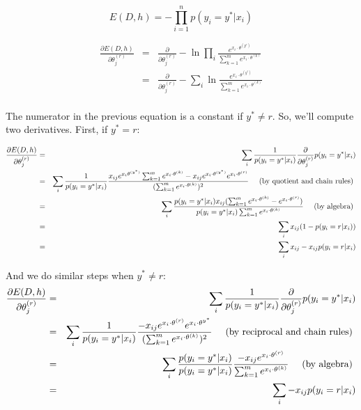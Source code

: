 \documentclass{article}
\begin{document}
$$
E(D, h) = - \prod_{i=1}^{n}p(y_i=y^*|x_i)
$$

\begin{eqnarray*}
\frac{\partial E(D,h)}{\partial \theta_j^{(r)}} & = & \frac{\partial}{\partial \theta_j^{(r)}}- \ln \prod_i \frac{e^{x_i \cdot \theta^{(y^*)}}}{\sum_{k=1}^m e^{x_i \cdot \theta^{(k)}}}\\
& = & \frac{\partial}{\partial \theta_j^{(r)}}- \sum_i \ln \frac{e^{x_i \cdot \theta^{(y^*)}}}{\sum_{k=1}^m e^{x_i \cdot \theta^{(k)}}}\\
\end{eqnarray*}

The numerator in the previous equation is a constant if $y^* \ne r$. So, we'll
compute two derivatives. First, if $y^* = r$:

\begin{eqnarray*}
\frac{\partial E(D,h)}{\partial \theta_j^{(r)}} & = & \sum_i \frac{1}{p(y_i=y^*|x_i)} \frac{\partial}{\partial \theta_j^{(r)}} p(y_i=y^*|x_i)\\
& = & \sum_i \frac{1}{p(y_i=y^*|x_i)} \frac{x_{ij} e^{x_i \theta^{(y^*)}}\sum_{k=1}^m e^{x_i \cdot \theta^{(k)}} - x_{ij}e^{x_i \cdot \theta^{(y^*)}} e^{x_i \cdot \theta^{(r)}}}{(\sum_{k=1}^m e^{x_i \cdot \theta^{(k)}})^2}  \hbox{ \hspace{.1in} (by quotient and chain rules) }\\
& = & \sum_i  \frac{p(y_i=y^*|x_i)x_{ij} (\sum_{k=1}^m  e^{x_i \cdot \theta^{(k)}} -  e^{x_i \cdot \theta^{(r)}})}{p(y_i=y^*|x_i) \sum_{k=1}^m  e^{x_i \cdot \theta^{(k)}}} \hbox{ \hspace{.1in} (by algebra) }\\
& = & \sum_i x_{ij}(1 - p(y_i=r|x_i)) \\
& = & \sum_i x_{ij} -  x_{ij}p(y_i=r|x_i)
\end{eqnarray*}

And we do similar steps when $y^* \ne r$:
\begin{eqnarray*}
\frac{\partial E(D,h)}{\partial \theta_j^{(r)}} & = & \sum_i \frac{1}{p(y_i=y^*|x_i)} \frac{\partial}{\partial \theta_j^{(r)}} p(y_i=y^*|x_i)\\
& = & \sum_i \frac{1}{p(y_i=y^*|x_i)} \frac{-x_{ij}e^{x_i \cdot \theta^{(r)}}  e^{x_i \cdot \theta^{y^*}}}{(\sum_{k=1}^m e^{x_i \cdot \theta^{(k)}})^2} \hbox{ \hspace{.1in} (by reciprocal and chain rules) }\\
& = & \sum_i \frac{p(y_i=y^*|x_i)}{p(y_i=y^*|x_i)} \frac{-x_{ij}e^{x_i \cdot \theta^{(r)}}}{\sum_{k=1}^m e^{x_i \cdot \theta^{(k)}}}  \hbox{ \hspace{.1in} (by algebra) }\\
& = & \sum_i -x_{ij}p(y_i=r|x_i)
\end{eqnarray*}
\end{document}
